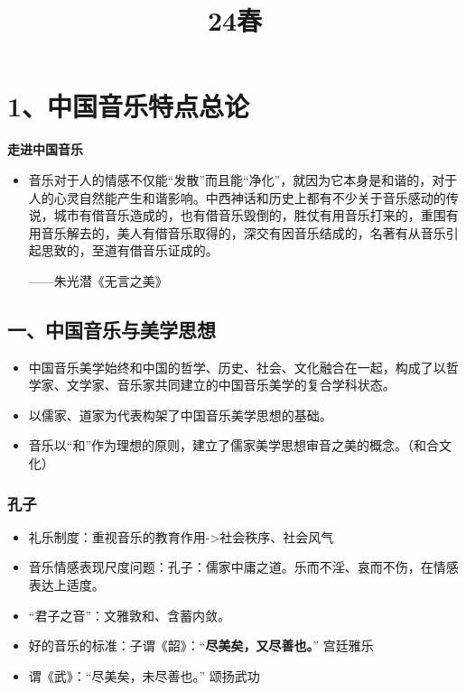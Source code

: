 \documentclass[
]{article}
\title{24春}
\author{}
\date{}
\providecommand{\tightlist}{%
  \setlength{\itemsep}{0pt}\setlength{\parskip}{0pt}}
\begin{document}
\maketitle

\section{1、中国音乐特点总论}\label{ux4e2dux56fdux97f3ux4e50ux7279ux70b9ux603bux8bba}

\textbf{走进中国音乐}

\begin{itemize}
\item
  音乐对于人的情感不仅能``发散''而且能``净化''，就因为它本身是和谐的，对于人的心灵自然能产生和谐影响。中西神话和历史上都有不少关于音乐感动的传说，城市有借音乐造成的，也有借音乐毁倒的，胜仗有用音乐打来的，重围有用音乐解去的，美人有借音乐取得的，深交有因音乐结成的，名著有从音乐引起思致的，至道有借音乐证成的。

  ------朱光潜《无言之美》
\end{itemize}

\subsection{一、中国音乐与美学思想}\label{ux4e00ux4e2dux56fdux97f3ux4e50ux4e0eux7f8eux5b66ux601dux60f3}

\begin{itemize}
\tightlist
\item
  中国音乐美学始终和中国的哲学、历史、社会、文化融合在一起，构成了以哲学家、文学家、音乐家共同建立的中国音乐美学的复合学科状态。
\item
  以儒家、道家为代表构架了中国音乐美学思想的基础。
\item
  音乐以``和''作为理想的原则，建立了儒家美学思想审音之美的概念。（和合文化）
\end{itemize}

\subsubsection{孔子}\label{ux5b54ux5b50}

\begin{itemize}
\tightlist
\item
  礼乐制度：重视音乐的教育作用-\textgreater 社会秩序、社会风气
\item
  音乐情感表现尺度问题：孔子：儒家中庸之道。乐而不淫、哀而不伤，在情感表达上适度。
\item
  ``君子之音''：文雅敦和、含蓄内敛。
\item
  好的音乐的标准：子谓《韶》：``\textbf{尽美矣，又尽善也。}'' 宫廷雅乐
\item
  谓《武》：``尽美矣，未尽善也。'' 颂扬武功
\end{itemize}
\end{document}

